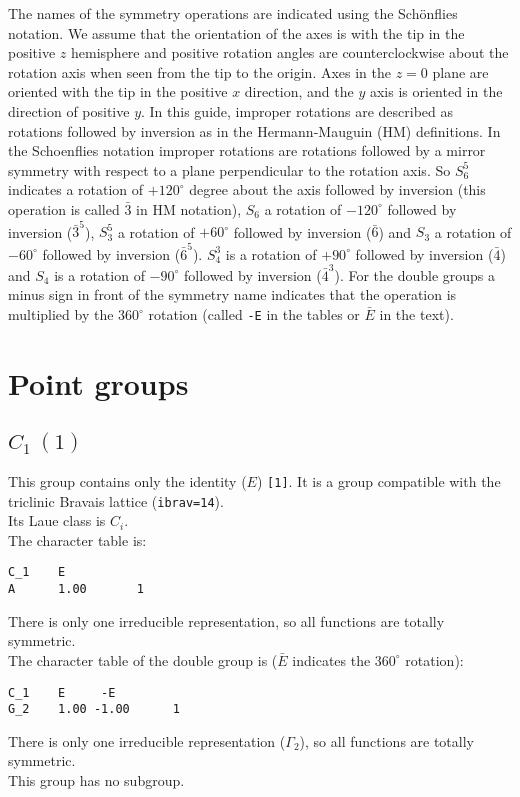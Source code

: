 \documentclass[12pt,a4paper]{article}
\begin{document}
The names of the symmetry operations are indicated using
the Sch\"onflies notation. 
We assume that the orientation of the axes is with the tip in the positive
$z$ hemisphere and positive rotation angles are counterclockwise about 
the rotation axis when seen from the tip to the origin. Axes in the $z=0$ 
plane are oriented with the tip in the
positive $x$ direction, and the $y$ axis is oriented in the 
direction of positive $y$. In this guide, improper rotations are described 
as rotations followed by inversion as in the Hermann-Mauguin (HM) 
definitions. In the Schoenflies notation improper rotations are rotations
followed by a mirror symmetry with respect to a plane perpendicular to 
the rotation axis.
So $S_6^5$ indicates a rotation of $+120^\circ$ degree about the axis 
followed by inversion (this operation is called $\bar 3$ in 
HM notation), $S_6$ a rotation of 
$-120^\circ$ followed by inversion ($\bar 3^5$), $S_3^5$ a rotation 
of $+60^\circ$ followed by inversion ($\bar 6$) and
$S_3$ a rotation of $-60^\circ$ followed by inversion ($\bar 6^5$).
$S_4^3$ is a rotation of $+90^\circ$ followed by inversion ($\bar 4$) and
$S_4$ is a rotation of $-90^\circ$ followed by inversion ($\bar 4^3$).
For the double groups a minus sign in front of the symmetry name
indicates that the operation is multiplied by the $360^\circ$ rotation 
(called \texttt{-E} in the tables or $\bar E$ in the text).

\newpage
\section{\color{coral}Point groups}

\subsection{\color{web-blue}$C_1\ (1)$}
This group contains only the identity ($E$) \texttt{[1]}. 
It is a group compatible with the triclinic Bravais lattice 
(\texttt{ibrav=14}). \\
Its Laue class is $C_i$. \\
The character table is:
\begin{verbatim}
C_1    E    
A      1.00       1
\end{verbatim}
There is only one irreducible representation, so all functions are 
totally symmetric. \\
The character table of the double group is ($\bar E$ indicates the
$360^\circ$ rotation): 
\begin{verbatim}
C_1    E     -E   
G_2    1.00 -1.00      1
\end{verbatim}
There is only one irreducible representation ($\Gamma_2$), 
so all functions are totally symmetric. \\
This group has no subgroup.
\end{document}
